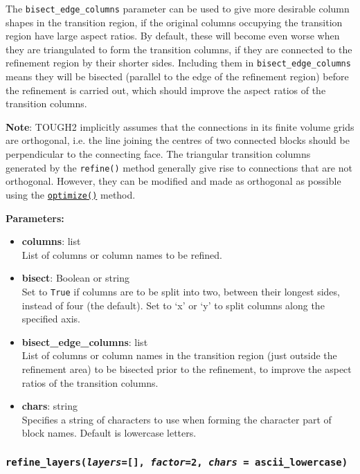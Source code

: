 The \texttt{bisect\_edge\_columns} parameter can be used to give more desirable column shapes in the transition region, if the original columns occupying the transition region have large aspect ratios.  By default, these will become even worse when they are triangulated to form the transition columns, if they are connected to the refinement region by their shorter sides.  Including them in \texttt{bisect\_edge\_columns} means they will be bisected (parallel to the edge of the refinement region) before the refinement is carried out, which should improve the aspect ratios of the transition columns.

\textbf{Note}: TOUGH2 implicitly assumes that the connections in its finite volume grids are orthogonal, i.e. the line joining the centres of two connected blocks should be perpendicular to the connecting face. The triangular transition columns generated by the \texttt{refine()} method generally give rise to connections that are not orthogonal. However, they can be modified and made as orthogonal as possible using the \hyperref[sec:mulgrid:optimize]{\texttt{optimize()}} method.

\textbf{Parameters:}
\begin{itemize}
  \item \textbf{columns}: list\\
    List of columns or column names to be refined.
  \item \textbf{bisect}: Boolean or string\\
    Set to \texttt{True} if columns are to be split into two, between their longest sides, instead of four (the default).  Set to `x' or `y' to split columns along the specified axis.
  \item \textbf{bisect\_edge\_columns}: list\\
    List of columns or column names in the transition region (just outside the refinement area) to be bisected prior to the refinement, to improve the aspect ratios of the transition columns.
  \item \textbf{chars}: string\\
    Specifies a string of characters to use when forming the character part of block names.  Default is lowercase letters.
\end{itemize}

\begin{snugshade}
\subsubsection{\texttt{refine\_layers(\emph{layers}=[], \emph{factor}=2, \emph{chars} = ascii\_lowercase)}}\end{snugshade}
\label{sec:mulgrid:refine_layers}

